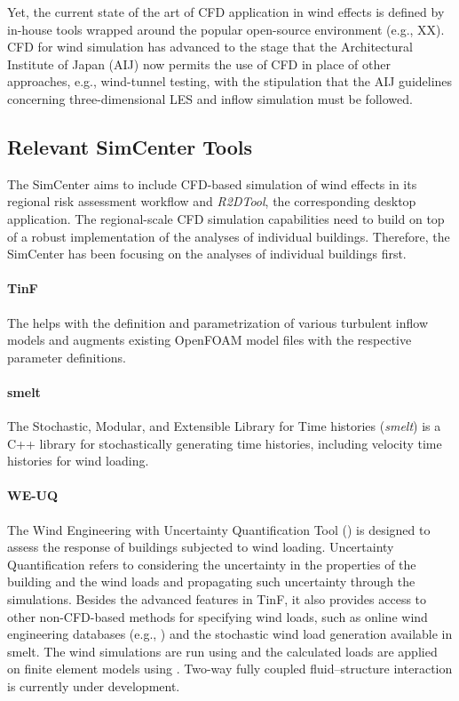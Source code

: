 Yet, the current state of the art of CFD application in wind effects is defined by in-house tools wrapped around the popular open-source  environment (e.g., XX). CFD for wind simulation has advanced to the stage that the Architectural Institute of Japan (AIJ) now permits the use of CFD in place of other approaches, e.g., wind-tunnel testing, with the stipulation that the AIJ guidelines concerning three-dimensional LES and inflow simulation must be followed.

\subsection{Relevant SimCenter Tools} 

The SimCenter aims to include CFD-based simulation of wind effects in its regional risk assessment workflow and \emph{R2DTool}, the corresponding desktop application. The regional-scale CFD simulation capabilities need to build on top of a robust implementation of the analyses of individual buildings. Therefore, the SimCenter has been focusing on the analyses of individual buildings first. 

\paragraph{TinF} The  helps with the definition and parametrization of various turbulent inflow models and augments existing OpenFOAM model files with the respective parameter definitions. 

\paragraph{smelt}
The Stochastic, Modular, and Extensible Library for Time histories (\emph{smelt}) is a C++ library for stochastically generating time histories, including velocity time histories for wind loading. 

\paragraph{WE-UQ} The Wind Engineering with Uncertainty Quantification Tool () is designed to assess the response of buildings subjected to wind loading. Uncertainty Quantification refers to considering the uncertainty in the properties of the building and the wind loads and propagating such uncertainty through the simulations. Besides the advanced features in TinF, it also provides access to other non-CFD-based methods for specifying wind loads, such as online wind engineering databases (e.g., \cite{tpu2020tpu}) and the stochastic wind load generation available in smelt. The wind simulations are run using  and the calculated loads are applied on finite element models using . Two-way fully coupled fluid--structure interaction is currently under development.

